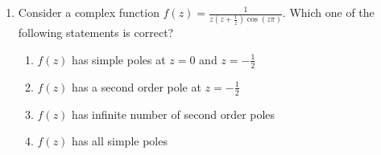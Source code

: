\documentclass[journal]{IEEEtran}
\newcommand{\brak}[1]{\left( #1 \right)}
\begin{document}
\begin{enumerate}
\item Consider a complex function $f\brak{z}=\frac{1}{z\brak{z+\frac{1}{z}}\cos\brak{z\pi}}$. Which one of the following statements is correct?

\begin{enumerate}
    \item $f\brak{z}$ has simple poles at $z=0$ and $z=-\frac{1}{2}$
    \item $f\brak{z}$ has a second order pole at $z=-\frac{1}{2}$
    \item $f\brak{z}$ has infinite number of second order poles
    \item $f\brak{z}$ has all simple poles
\end{enumerate}



\end{enumerate}
\end{document}
